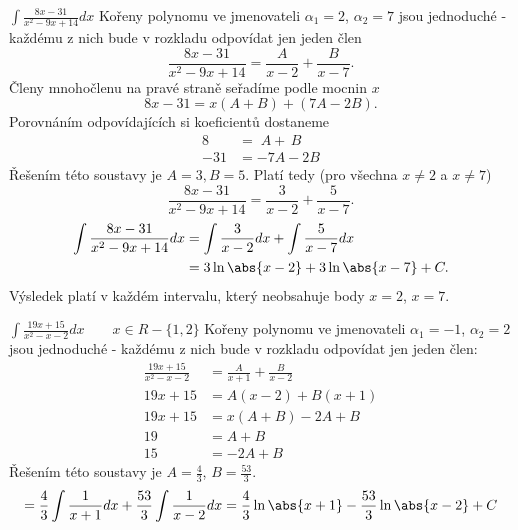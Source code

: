       \begin{example}$\displaystyle\int{\frac{8x-31}{x^2-9x+14}}dx$\cite[s.~90]{Knichal}\newline
        Kořeny polynomu ve jmenovateli $\alpha_1 = 2$, $\alpha_2 = 7$ jsou jednoduché - každému z
        nich bude v rozkladu odpovídat jen jeden člen $$\frac{8x-31}{x^2-9x+14} = \frac{A}{x-2}
        + \frac{B}{x-7}.$$ Členy mnohočlenu na pravé straně seřadíme podle mocnin $x$ $$8x-31 =
         x(A+B)+(7A-2B).$$ Porovnáním odpovídajících si koeficientů dostaneme
        \begin{align*}
          8   &=   \; A + \, B \\
          -31 &= -7A - 2B
        \end{align*}
        Řešením této soustavy je $A = 3, B = 5$. Platí tedy (pro všechna $x \neq 2$ a $x \neq 7$)
        $$\frac{8x-31}{x^2-9x+14} = \frac{3}{x-2} + \frac{5}{x-7}.$$
        \begin{align*}
          \int{\frac{8x-31}{x^2-9x+14}}dx 
            &= \int{\frac{3}{x-2}}dx + \int{\frac{5}{x-7}}dx      \\
            &= 3\ln\abs{x-2} + 3\ln\abs{x-7} + C.
        \end{align*}
        Výsledek platí v každém intervalu, který neobsahuje body \(x = 2\), \(x = 7\).
      \end{example}
      
      \begin{example}\label{MA:eq_ex1}$\displaystyle\int{\frac{19x+15}{x^2-x-2}}dx \qquad 
      x\in
        R-\{1,2\} $ \newline Kořeny polynomu ve jmenovateli $\alpha_1 = -1$, $\alpha_2 = 2$ jsou
        jednoduché - každému z nich bude v rozkladu odpovídat jen jeden člen: 
        \begin{align*}
          \frac{19x+15}{x^2-x-2}     &= \frac{A}{x+1} + \frac{B}{x-2} \\
                           19x +15   &= A(x-2) + B(x+1)               \\
                           19x +15   &= x(A+B) - 2A + B               \\
                           19        &= A + B                         \\
                                15   &=        - 2A + B
        \end{align*}              
        Řešením této soustavy je $A = \frac{4}{3}$, $B = \frac{53}{3}$.
        \begin{equation*}
          = \frac{4}{3}\int{\frac{1}{x+1}}dx+\frac{53}{3}\int{\frac{1}{x-2}}dx 
          = \frac{4}{3}\ln\abs{x+1} - \frac{53}{3}\ln\abs{x-2} +  C
        \end{equation*}      
      \end{example}
      

